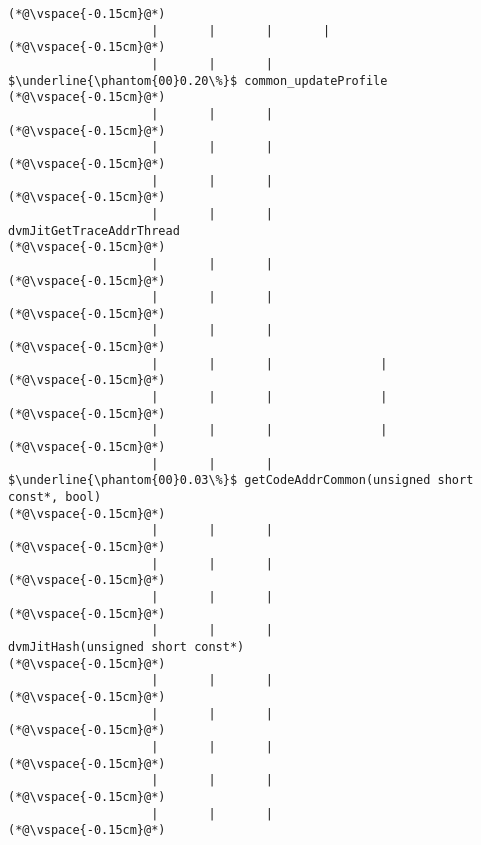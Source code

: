 \begin{lstlisting}[caption=Metodikutsu C$\to$Java 20 int-parametrilla, label=profile:C2JBenchmark00146, numberbychapter=true, frame=lines, float, floatplacement=t]
(*@\vspace{-0.15cm}@*)
                    |       |       |       |
(*@\vspace{-0.15cm}@*)
                    |       |       |        $\underline{\phantom{00}0.20\%}$ common_updateProfile
(*@\vspace{-0.15cm}@*)
                    |       |       |
(*@\vspace{-0.15cm}@*)
                    |       |       |
(*@\vspace{-0.15cm}@*)
                    |       |       |
(*@\vspace{-0.15cm}@*)
                    |       |       |                dvmJitGetTraceAddrThread
(*@\vspace{-0.15cm}@*)
                    |       |       |               
(*@\vspace{-0.15cm}@*)
                    |       |       |               
(*@\vspace{-0.15cm}@*)
                    |       |       |               
(*@\vspace{-0.15cm}@*)
                    |       |       |               |
(*@\vspace{-0.15cm}@*)
                    |       |       |               |
(*@\vspace{-0.15cm}@*)
                    |       |       |               |
(*@\vspace{-0.15cm}@*)
                    |       |       |                $\underline{\phantom{00}0.03\%}$ getCodeAddrCommon(unsigned short const*, bool)
(*@\vspace{-0.15cm}@*)
                    |       |       |
(*@\vspace{-0.15cm}@*)
                    |       |       |
(*@\vspace{-0.15cm}@*)
                    |       |       |
(*@\vspace{-0.15cm}@*)
                    |       |       |                         dvmJitHash(unsigned short const*)
(*@\vspace{-0.15cm}@*)
                    |       |       |
(*@\vspace{-0.15cm}@*)
                    |       |       |
(*@\vspace{-0.15cm}@*)
                    |       |       |
(*@\vspace{-0.15cm}@*)
                    |       |       |
(*@\vspace{-0.15cm}@*)
                    |       |       |
(*@\vspace{-0.15cm}@*)

\end{lstlisting}
